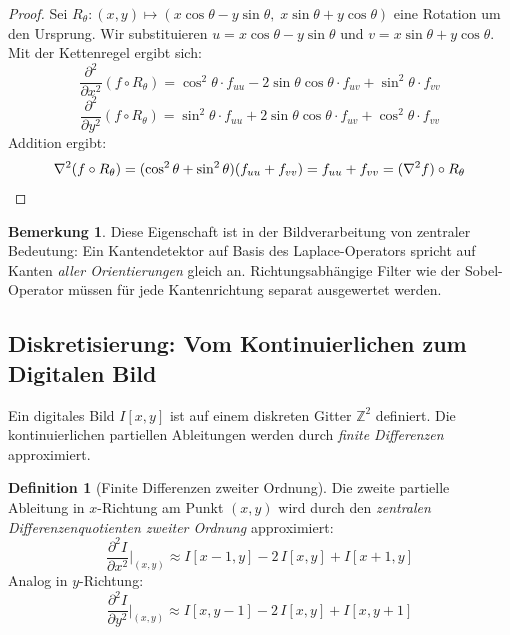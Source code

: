 ﻿\documentclass[a4paper,12pt]{article}
\theoremstyle{definition}
\newtheorem{definition}{Definition}
\newtheorem{bemerkung}{Bemerkung}
\begin{document}
\begin{proof}
    Sei $R_\theta: (x,y) \mapsto (x\cos\theta - y\sin\theta,\; x\sin\theta + y\cos\theta)$
    eine Rotation um den Ursprung. Wir substituieren
    $u = x\cos\theta - y\sin\theta$ und $v = x\sin\theta + y\cos\theta$.
    Mit der Kettenregel ergibt sich:
    \[
        \frac{\partial^2}{\partial x^2}(f \circ R_\theta)
        = \cos^2\theta \cdot f_{uu} - 2\sin\theta\cos\theta \cdot f_{uv} + \sin^2\theta \cdot f_{vv}
    \]
    \[
        \frac{\partial^2}{\partial y^2}(f \circ R_\theta)
        = \sin^2\theta \cdot f_{uu} + 2\sin\theta\cos\theta \cdot f_{uv} + \cos^2\theta \cdot f_{vv}
    \]
    Addition ergibt:
    \[
        \nabla^2(f \circ R_\theta)
        = (\cos^2\theta + \sin^2\theta)(f_{uu} + f_{vv})
        = f_{uu} + f_{vv}
        = (\nabla^2 f) \circ R_\theta \qedhere
    \]
\end{proof}

\begin{bemerkung}
    Diese Eigenschaft ist in der Bildverarbeitung von zentraler Bedeutung: Ein Kantendetektor auf
    Basis des Laplace-Operators spricht auf Kanten \emph{aller Orientierungen} gleich an. Richtungsabhängige
    Filter wie der Sobel-Operator müssen für jede Kantenrichtung separat ausgewertet werden.
\end{bemerkung}

\subsection{Diskretisierung: Vom Kontinuierlichen zum Digitalen Bild}

Ein digitales Bild $I[x,y]$ ist auf einem diskreten Gitter $\mathbb{Z}^2$ definiert. Die
kontinuierlichen partiellen Ableitungen werden durch \emph{finite Differenzen} approximiert.

\begin{definition}[Finite Differenzen zweiter Ordnung]
    Die zweite partielle Ableitung in $x$-Richtung am Punkt $(x,y)$ wird durch den
    \emph{zentralen Differenzenquotienten zweiter Ordnung} approximiert:
    \[
        \frac{\partial^2 I}{\partial x^2}\bigg|_{(x,y)}
        \approx I[x-1,y] - 2\,I[x,y] + I[x+1,y]
    \]
    Analog in $y$-Richtung:
    \[
        \frac{\partial^2 I}{\partial y^2}\bigg|_{(x,y)}
        \approx I[x,y-1] - 2\,I[x,y] + I[x,y+1]
    \]
\end{definition}
\end{document}
